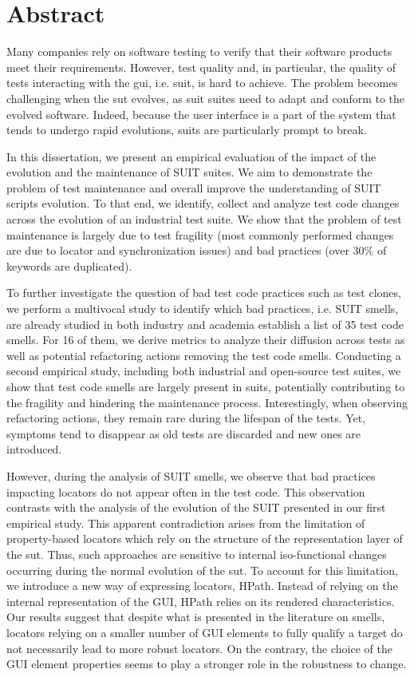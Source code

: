 \chapter*{Abstract}

Many companies rely on software testing to verify that their software products meet their requirements. However, test quality and, in particular, the quality of tests interacting with the \gls{gui}, i.e. \gls{suit}, is hard to achieve. The problem becomes challenging when the \gls{sut} evolves, as \gls{suit} suites need to adapt and conform to the evolved software. Indeed, because the user interface is a part of the system that tends to undergo rapid evolutions, \gls{suit}s are particularly prompt to break.

In this dissertation, we present an empirical evaluation of the impact of the evolution and the maintenance of SUIT suites. We aim to demonstrate the problem of test maintenance and overall improve the understanding of SUIT scripts evolution. To that end, we identify, collect and analyze test code changes across the evolution of an industrial test suite. We show that the problem of test maintenance is largely due to test fragility (most commonly performed changes are due to locator and synchronization issues) and bad practices (over 30\% of keywords are duplicated). 

To further investigate the question of bad test code practices such as test clones, we perform a multivocal study to identify which bad practices, i.e. SUIT smells, are already studied in both industry and academia establish a list of 35 test code smells. For 16 of them, we derive metrics to analyze their diffusion across tests as well as potential refactoring actions removing the test code smells. Conducting a second empirical study, including both industrial and open-source test suites, we show that test code smells are largely present in \gls{suit}s, potentially contributing to the fragility and hindering the maintenance process. Interestingly, when observing refactoring actions, they remain rare during the lifespan of the tests. Yet, symptoms tend to disappear as old tests are discarded and new ones are introduced.

However, during the analysis of SUIT smells, we observe that bad practices impacting locators do not appear often in the test code. This observation contrasts with the analysis of the evolution of the SUIT presented in our first empirical study.  This apparent contradiction arises from the limitation of property-based locators which rely on the structure of the representation layer of the \gls{sut}. Thus, such approaches are sensitive to internal iso-functional changes occurring during the normal evolution of the \gls{sut}. To account for this limitation, we introduce a new way of expressing locators, HPath. Instead of relying on the internal representation of the GUI, HPath relies on its rendered characteristics. Our results suggest that despite what is presented in the literature on smells, locators relying on a smaller number of GUI elements to fully qualify a target do not necessarily lead to more robust locators. On the contrary, the choice of the GUI element properties seems to play a stronger role in the robustness to change.

